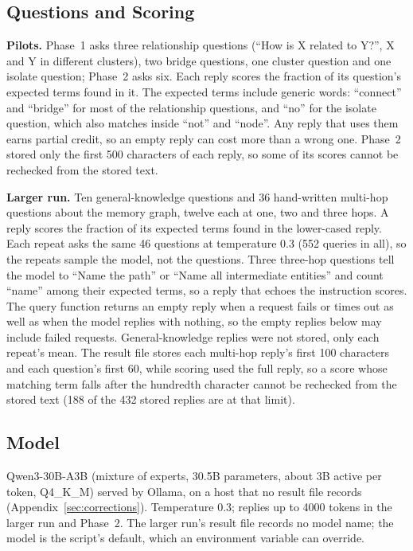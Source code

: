 \documentclass[11pt,a4paper]{article}
\begin{document}
\subsection{Questions and Scoring}

\textbf{Pilots.} Phase~1 asks three relationship questions (``How is X related to Y?'', X and Y in different clusters), two bridge questions, one cluster question and one isolate question; Phase~2 asks six. Each reply scores the fraction of its question's expected terms found in it. The expected terms include generic words: ``connect'' and ``bridge'' for most of the relationship questions, and ``no'' for the isolate question, which also matches inside ``not'' and ``node''. Any reply that uses them earns partial credit, so an empty reply can cost more than a wrong one. Phase~2 stored only the first 500 characters of each reply, so some of its scores cannot be rechecked from the stored text.

\textbf{Larger run.} Ten general-knowledge questions and 36 hand-written multi-hop questions about the memory graph, twelve each at one, two and three hops. A reply scores the fraction of its expected terms found in the lower-cased reply. Each repeat asks the same 46 questions at temperature 0.3 (552 queries in all), so the repeats sample the model, not the questions. Three three-hop questions tell the model to ``Name the path'' or ``Name all intermediate entities'' and count ``name'' among their expected terms, so a reply that echoes the instruction scores. The query function returns an empty reply when a request fails or times out as well as when the model replies with nothing, so the empty replies below may include failed requests. General-knowledge replies were not stored, only each repeat's mean. The result file stores each multi-hop reply's first 100 characters and each question's first 60, while scoring used the full reply, so a score whose matching term falls after the hundredth character cannot be rechecked from the stored text (188 of the 432 stored replies are at that limit).

\subsection{Model}

Qwen3-30B-A3B (mixture of experts, 30.5B parameters, about 3B active per token, Q4\_K\_M) served by Ollama, on a host that no result file records (Appendix~\ref{sec:corrections}). Temperature 0.3; replies up to 4000 tokens in the larger run and Phase~2. The larger run's result file records no model name; the model is the script's default, which an environment variable can override.
\end{document}
